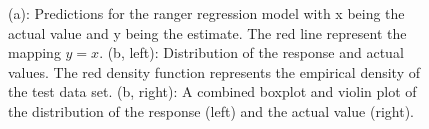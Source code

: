 \documentclass[
]{article}
\begin{document}
\begin{figure}[h]
    \centering
    \qquad
    \caption{(a): Predictions for the ranger regression model with x being the actual value and y being the estimate. The red line represent the mapping $y=x$. (b, left): Distribution of the response and actual values. The red density function represents the empirical density of the test data set. (b, right): A combined boxplot and violin plot of the distribution of the response (left) and the actual value (right).}
\end{figure}
\end{document}

